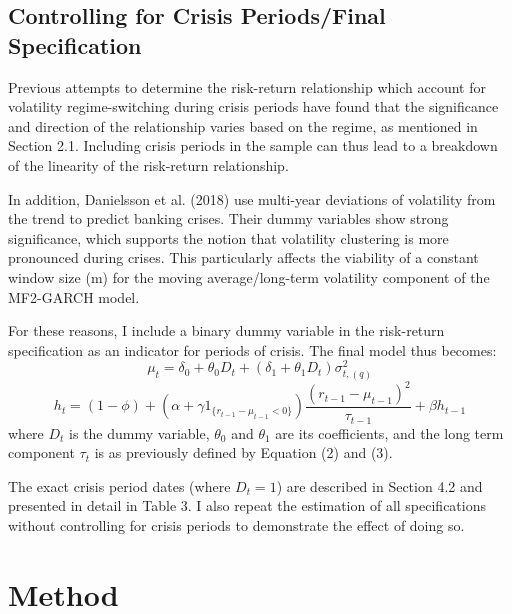 \documentclass[12pt]{article}
\begin{document}
\subsection{Controlling for Crisis Periods/Final Specification}
Previous attempts to determine the risk-return relationship which account for volatility regime-switching during crisis periods have found that the significance and direction of the relationship varies based on the regime, as mentioned in Section 2.1. Including crisis periods in the sample can thus lead to a breakdown of the linearity of the risk-return relationship.\par
In addition, Danielsson et al. (2018) use multi-year deviations of volatility from the trend to predict banking crises. Their dummy variables show strong significance, which supports the notion that volatility clustering is more pronounced during crises. This particularly affects the viability of a constant window size (m) for the moving average/long-term volatility component of the MF2-GARCH model.\par
For these reasons, I include a binary dummy variable in the risk-return specification as an indicator for periods of crisis. The final model thus becomes:
\begin{equation}
\mu_t=\delta_0+\theta_0D_t+(\delta_1+\theta_1D_t)\sigma_{t,(q)}^2
\end{equation}
\begin{equation}
h_t=(1-\phi)+(\alpha+\gamma1_{\{r_{t-1}-\mu_{t-1}<0\}})\frac{(r_{t-1}-\mu_{t-1})^2}{\tau_{t-1}}+\beta h_{t-1}
\end{equation}
where $D_t$ is the dummy variable, $\theta_0$ and $\theta_1$ are its coefficients, and the long term component $\tau_t$ is as previously defined by Equation (2) and (3).\par
The exact crisis period dates (where $D_t=1$) are described in Section 4.2 and presented in detail in Table 3. I also repeat the estimation of all specifications without controlling for crisis periods to demonstrate the effect of doing so.


\section{Method}
\end{document}
